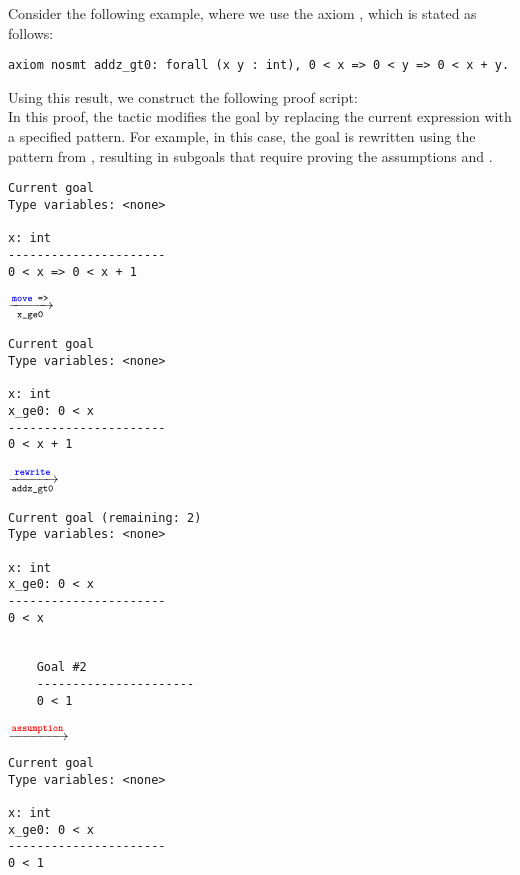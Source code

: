 Consider the following example, where we use the axiom , which is stated as follows:\\
\begin{lstlisting}[style=easycrypt]
axiom nosmt addz_gt0: forall (x y : int), 0 < x => 0 < y => 0 < x + y.
\end{lstlisting}
Using this result, we construct the following proof script:\\
In this proof, the  tactic modifies the goal by replacing the current expression with a specified pattern. For example, in this case, the goal 
 is rewritten using the pattern from , resulting in subgoals that require proving the assumptions  and .
\begin{center}
\hfill\begin{minipage}{.25\textwidth}
\begin{lstlisting}[style=normal]
Current goal
Type variables: <none>

x: int
----------------------
0 < x => 0 < x + 1	
\end{lstlisting}
\end{minipage}\hfill$\xrightarrow[\texttt{x\_ge0}]{\texttt{\textcolor{blue}{\bfseries move} =>}}$\hfill
\begin{minipage}{.25\textwidth}
\begin{lstlisting}[style=normal]
Current goal
Type variables: <none>

x: int
x_ge0: 0 < x
----------------------
0 < x + 1	
\end{lstlisting}
\end{minipage}
\end{center}
\begin{center}
\hfill$\xrightarrow[\texttt{addz\_gt0}]{\texttt{\textcolor{blue}{\bfseries rewrite}}}$\hfill
\begin{minipage}{.35\textwidth}
\begin{lstlisting}[style=normal]
Current goal (remaining: 2)
Type variables: <none>

x: int
x_ge0: 0 < x
----------------------
0 < x


	Goal #2	
	----------------------
	0 < 1
\end{lstlisting}
\end{minipage}\hfill$\xrightarrow{\texttt{\textcolor{red}{\bfseries assumption}}}$\hfill
\begin{minipage}{.25\textwidth}
\begin{lstlisting}[style=normal]
Current goal
Type variables: <none>

x: int
x_ge0: 0 < x
----------------------
0 < 1	
\end{lstlisting}
\end{minipage}
\end{center}
